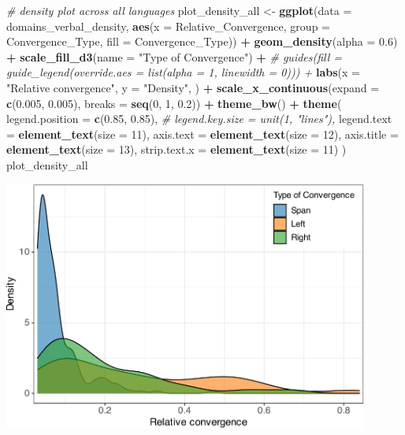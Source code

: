 \documentclass[
]{article}
\newenvironment{Shaded}{\begin{snugshade}}{\end{snugshade}}
\newcommand{\AttributeTok}[1]{\textcolor[rgb]{0.13,0.29,0.53}{#1}}
\newcommand{\CommentTok}[1]{\textcolor[rgb]{0.56,0.35,0.01}{\textit{#1}}}
\newcommand{\DecValTok}[1]{\textcolor[rgb]{0.00,0.00,0.81}{#1}}
\newcommand{\FloatTok}[1]{\textcolor[rgb]{0.00,0.00,0.81}{#1}}
\newcommand{\FunctionTok}[1]{\textcolor[rgb]{0.13,0.29,0.53}{\textbf{#1}}}
\newcommand{\NormalTok}[1]{#1}
\newcommand{\OtherTok}[1]{\textcolor[rgb]{0.56,0.35,0.01}{#1}}
\newcommand{\SpecialCharTok}[1]{\textcolor[rgb]{0.81,0.36,0.00}{\textbf{#1}}}
\newcommand{\StringTok}[1]{\textcolor[rgb]{0.31,0.60,0.02}{#1}}
\begin{document}
\begin{Shaded}
\begin{Highlighting}[]
\CommentTok{\# density plot across all languages}
\NormalTok{plot\_density\_all }\OtherTok{\textless{}{-}} \FunctionTok{ggplot}\NormalTok{(}\AttributeTok{data =}\NormalTok{ domains\_verbal\_density, }\FunctionTok{aes}\NormalTok{(}\AttributeTok{x =}\NormalTok{ Relative\_Convergence, }\AttributeTok{group =}\NormalTok{ Convergence\_Type, }\AttributeTok{fill =}\NormalTok{ Convergence\_Type)) }\SpecialCharTok{+}
  \FunctionTok{geom\_density}\NormalTok{(}\AttributeTok{alpha =} \FloatTok{0.6}\NormalTok{) }\SpecialCharTok{+}
  \FunctionTok{scale\_fill\_d3}\NormalTok{(}\AttributeTok{name =} \StringTok{"Type of Convergence"}\NormalTok{) }\SpecialCharTok{+}
  \CommentTok{\# guides(fill = guide\_legend(override.aes = list(alpha = 1, linewidth = 0))) +}
  \FunctionTok{labs}\NormalTok{(}\AttributeTok{x =} \StringTok{"Relative convergence"}\NormalTok{, }\AttributeTok{y =} \StringTok{"Density"}\NormalTok{, ) }\SpecialCharTok{+}
  \FunctionTok{scale\_x\_continuous}\NormalTok{(}\AttributeTok{expand =} \FunctionTok{c}\NormalTok{(}\FloatTok{0.005}\NormalTok{, }\FloatTok{0.005}\NormalTok{), }\AttributeTok{breaks =} \FunctionTok{seq}\NormalTok{(}\DecValTok{0}\NormalTok{, }\DecValTok{1}\NormalTok{, }\FloatTok{0.2}\NormalTok{)) }\SpecialCharTok{+}
  \FunctionTok{theme\_bw}\NormalTok{() }\SpecialCharTok{+}
  \FunctionTok{theme}\NormalTok{(}
    \AttributeTok{legend.position =} \FunctionTok{c}\NormalTok{(}\FloatTok{0.85}\NormalTok{, }\FloatTok{0.85}\NormalTok{),}
    \CommentTok{\# legend.key.size = unit(1, "lines"),}
    \AttributeTok{legend.text =} \FunctionTok{element\_text}\NormalTok{(}\AttributeTok{size =} \DecValTok{11}\NormalTok{),}
    \AttributeTok{axis.text =} \FunctionTok{element\_text}\NormalTok{(}\AttributeTok{size =} \DecValTok{12}\NormalTok{),}
    \AttributeTok{axis.title =} \FunctionTok{element\_text}\NormalTok{(}\AttributeTok{size =} \DecValTok{13}\NormalTok{),}
    \AttributeTok{strip.text.x =} \FunctionTok{element\_text}\NormalTok{(}\AttributeTok{size =} \DecValTok{11}\NormalTok{)}
\NormalTok{  )}
\NormalTok{plot\_density\_all}
\end{Highlighting}
\end{Shaded}

\begin{center}\includegraphics[width=0.9\textwidth,height=\textheight]{02_analyses_chapter17_files/figure-latex/dens rconv-1} \end{center}
\end{document}
